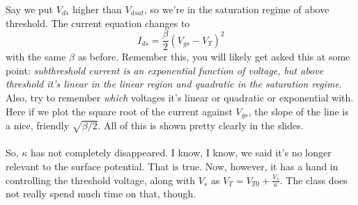 \documentclass[report]{subfiles}
\begin{document}
Say we put $V_{ds}$ higher than $V_{dsat}$, so we're in the saturation regime of above threshold. The current equation changes to
\begin{equation}
I_{ds} = \frac{\beta}{2}(V_{gs} - V_T)^2
\label{abvSatEqn}
\end{equation}
with the same $\beta$ as before. Remember this, you will likely get asked this at some point: \textsl{subthreshold current is an exponential function of voltage, but above threshold it's linear in the linear region and \emph{quadratic} in the saturation regime}. Also, try to remember \emph{which} voltages it's linear or quadratic or exponential with. Here if we plot the square root of the current against $V_{gs}$, the slope of the line is a nice, friendly $\sqrt{\beta/2}$. All of this is shown pretty clearly in the slides.\\ \\
So, $\kappa$ has not completely disappeared. I know, I know, we said it's no longer relevant to the surface potential. That is true. Now, however, it has a hand in controlling the threshold voltage, along with $V_s$ as $V_T = V_{T0} + \frac{V_s}{\kappa}$. The class does not really spend much time on that, though.\\ \\
\end{document}
